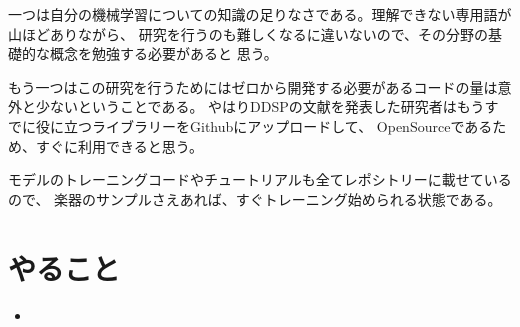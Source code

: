 \documentclass[a4paper, 12pt]{article}
\begin{document}
一つは自分の機械学習についての知識の足りなさである。理解できない専用語が山ほどありながら、
研究を行うのも難しくなるに違いないので、その分野の基礎的な概念を勉強する必要があると
思う。

もう一つはこの研究を行うためにはゼロから開発する必要があるコードの量は意外と少ないということである。
やはりDDSPの文献を発表した研究者はもうすでに役に立つライブラリーをGithubにアップロードして、
OpenSourceであるため、すぐに利用できると思う。

モデルのトレーニングコードやチュートリアルも全てレポシトリーに載せているので、
楽器のサンプルさえあれば、すぐトレーニング始められる状態である。

\section*{やること}
\begin{itemize}
    \item 
\end{itemize}



\end{document}
